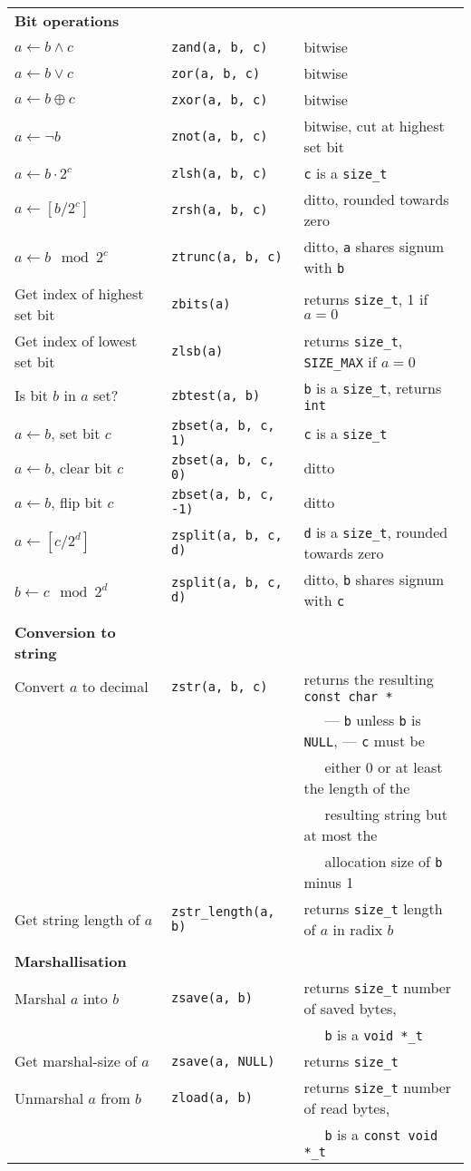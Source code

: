 \documentclass[10pt,draft]{article}
\newcommand{\size}{{\tt size\_t}}
\newcommand{\ullong}{{\tt unsigned long long int}}
\newcommand{\entry}[3]{ #2 & {\tt #1} & #3 \\ }
\newcommand{\entrycont}[1]{ & & $~~~~~$ #1 \\ }
\newcommand{\entryTwo}[4]{\entry{#1}{#2}{#3}\entrycont{#4}}
\newcommand{\entryThree}[5]{\entryTwo{#1}{#2}{#3}{#4}\entrycont{#5}}
\newcommand{\entryFour}[6]{\entryThree{#1}{#2}{#3}{#4}{#5}\entrycont{#6}}
\newcommand{\entryFive}[7]{\entryFour{#1}{#2}{#3}{#4}{#5}{#6}\entrycont{#7}}
\begin{document}
\begin{tabular}{lll}



\textbf{Bit operations} \\
\entry{zand(a, b, c)}      {$a \gets b \wedge c$}         {bitwise}
\entry{zor(a, b, c)}       {$a \gets b \vee c$}           {bitwise}
\entry{zxor(a, b, c)}      {$a \gets b \oplus c$}         {bitwise}
\entry{znot(a, b, c)}      {$a \gets \lnot b$}            {bitwise, cut at highest set bit}
\entry{zlsh(a, b, c)}      {$a \gets b \cdot 2^c$}        {{\tt c} is a \size{}}
\entry{zrsh(a, b, c)}      {$a \gets [b / 2^c]$}          {ditto, rounded towards zero}
\entry{ztrunc(a, b, c)}    {$a \gets b \mod 2^c$}         {ditto, {\tt a} shares signum with {\tt b}}
\entry{zbits(a)}           {Get index of highest set bit} {returns \size{}, 1 if $a = 0$}
\entry{zlsb(a)}            {Get index of lowest set bit}  {returns \size{}, {\tt SIZE\_MAX} if $a = 0$}
\entry{zbtest(a, b)}       {Is bit $b$ in $a$ set?}       {{\tt b} is a \size{}, returns {\tt int}}
\entry{zbset(a, b, c, 1)}  {$a \gets b$, set bit $c$}     {{\tt c} is a \size{}}
\entry{zbset(a, b, c, 0)}  {$a \gets b$, clear bit $c$}   {ditto}
\entry{zbset(a, b, c, -1)} {$a \gets b$, flip bit $c$}    {ditto}
\entry{zsplit(a, b, c, d)} {$a \gets [c / 2^d]$}          {{\tt d} is a \size{}, rounded towards zero}
\entry{zsplit(a, b, c, d)} {$b \gets c \mod 2^d$}         {ditto, {\tt b} shares signum with {\tt c}}
\\

\textbf{Conversion to string} \\
\entryFive{zstr(a, b, c)}           {Convert $a$ to decimal}   {returns the resulting {\tt const char *}}
                                                               {--- {\tt b} unless {\tt b} is
                                                                    {\tt NULL}, --- {\tt c} must be}
                                                               {either 0 or at least the length of the}
                                                               {resulting string but at most the}
                                                               {allocation size of {\tt b} minus 1}
\entry    {zstr\_length(a, b)}      {Get string length of $a$} {returns \size{} length of $a$ in radix $b$}
\\

\textbf{Marshallisation} \\
\entryTwo{zsave(a, b)}    {Marshal $a$ into $b$}    {returns \size{} number of saved bytes,}
                                                    {{\tt b} is a {\tt void *\_t}}
\entry   {zsave(a, NULL)} {Get marshal-size of $a$} {returns \size{}}
\entryTwo{zload(a, b)}    {Unmarshal $a$ from $b$}  {returns \size{} number of read bytes,}
                                                    {{\tt b} is a {\tt const void *\_t}}


\end{tabular}
\end{document}
